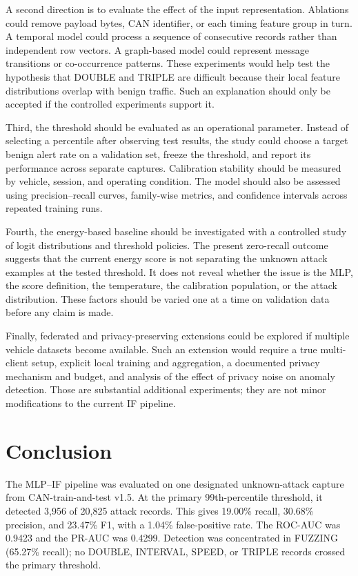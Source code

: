 \documentclass[journal]{IEEEtran}
\begin{document}
A second direction is to evaluate the effect of the input representation. Ablations could remove payload bytes, CAN identifier, or each timing feature group in turn. A temporal model could process a sequence of consecutive records rather than independent row vectors. A graph-based model could represent message transitions or co-occurrence patterns. These experiments would help test the hypothesis that DOUBLE and TRIPLE are difficult because their local feature distributions overlap with benign traffic. Such an explanation should only be accepted if the controlled experiments support it.

Third, the threshold should be evaluated as an operational parameter. Instead of selecting a percentile after observing test results, the study could choose a target benign alert rate on a validation set, freeze the threshold, and report its performance across separate captures. Calibration stability should be measured by vehicle, session, and operating condition. The model should also be assessed using precision--recall curves, family-wise metrics, and confidence intervals across repeated training runs.

Fourth, the energy-based baseline should be investigated with a controlled study of logit distributions and threshold policies. The present zero-recall outcome suggests that the current energy score is not separating the unknown attack examples at the tested threshold. It does not reveal whether the issue is the MLP, the score definition, the temperature, the calibration population, or the attack distribution. These factors should be varied one at a time on validation data before any claim is made.

Finally, federated and privacy-preserving extensions could be explored if multiple vehicle datasets become available. Such an extension would require a true multi-client setup, explicit local training and aggregation, a documented privacy mechanism and budget, and analysis of the effect of privacy noise on anomaly detection. Those are substantial additional experiments; they are not minor modifications to the current IF pipeline.

\section{Conclusion}
The MLP--IF pipeline was evaluated on one designated unknown-attack capture from CAN-train-and-test v1.5. At the primary 99th-percentile threshold, it detected 3,956 of 20,825 attack records. This gives 19.00\% recall, 30.68\% precision, and 23.47\% F1, with a 1.04\% false-positive rate. The ROC-AUC was 0.9423 and the PR-AUC was 0.4299. Detection was concentrated in FUZZING (65.27\% recall); no DOUBLE, INTERVAL, SPEED, or TRIPLE records crossed the primary threshold.
\end{document}

